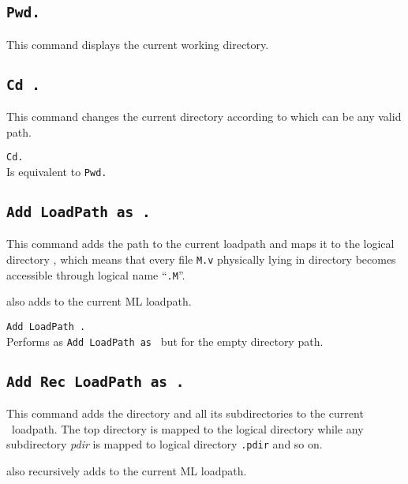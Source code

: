\subsection{\tt Pwd.}\label{Pwd}
This command displays the current working directory.

\subsection{\tt Cd {\str}.}
This command changes the current directory according to {\str} 
which can be any valid path.

\begin{Variants}
\item {\tt Cd.}\\
  Is equivalent to {\tt Pwd.}
\end{Variants}

\subsection{\tt Add LoadPath {\str} as {\dirpath}.}
\label{AddLoadPath}

This command adds the path {\str} to the current {\Coq} loadpath and
maps it to the logical directory {\dirpath}, which means that every
file {\tt M.v} physically lying in directory {\str} becomes accessible
through logical name ``{\dirpath}{\tt{.M}}''. 

 also adds {\str} to the current ML loadpath.

\begin{Variants}
\item {\tt Add LoadPath {\str}.}\\
Performs as {\tt Add LoadPath {\str} as {\dirpath}} but for the empty directory path.
\end{Variants}

\subsection{\tt Add Rec LoadPath {\str} as {\dirpath}.}\label{AddRecLoadPath}
This command adds the directory {\str} and all its subdirectories 
to the current \Coq\ loadpath. The top directory {\str} is mapped to the logical directory {\dirpath} while any subdirectory {\textsl{pdir}} is mapped to logical directory {\dirpath}{\tt{.pdir}} and so on.

 also recursively adds {\str} to the current ML loadpath.


